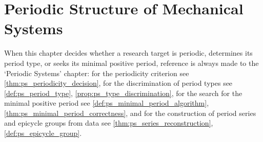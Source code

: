 \chapter{Periodic Structure of Mechanical Systems}

\begin{remark}\label{rem:mech_ps_hook}
When this chapter decides whether a research target is periodic, determines its period type, or seeks its minimal positive period, reference is always made to the `Periodic Systems' chapter:
for the periodicity criterion see \cref{thm:ps_periodicity_decision},
for the discrimination of period types see \cref{def:ps_period_type}, \cref{prop:ps_type_discrimination},
for the search for the minimal positive period see \cref{def:ps_minimal_period_algorithm}, \cref{thm:ps_minimal_period_correctness},
and for the construction of period series and epicycle groups from data see \cref{thm:ps_series_reconstruction}, \cref{def:ps_epicycle_group}.
\end{remark}

